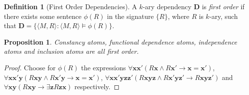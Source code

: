 \documentclass{article}
\newtheorem{Proposition}[Theorem]{Proposition}
\theoremstyle{definition}
\newtheorem{Definition}[Theorem]{Definition}
\newcommand{\tuple}{\mathbf}
\newcommand{\M}{\mathfrak M}
\newcommand{\D}{\mathbf D}
\begin{document}
\begin{Definition}[First Order Dependencies]
A $k$-ary dependency $\D$ is \emph{first order} if there exists some sentence $\phi(R)$ in the signature $\{R\}$, where $R$ is $k$-ary, such that $\D = \{\langle M, R\rangle : \langle M, R\rangle \models \phi(R)\}$.%
\label{def:fodep}
\end{Definition}
\begin{Proposition}
Constancy atoms, functional dependence atoms, independence atoms and inclusion atoms are all first order. 
\end{Proposition}
\begin{proof}
Choose for $\phi(R)$ the expressions $\forall \tuple x \tuple x' (R \tuple x \wedge R \tuple x' \rightarrow \tuple x = \tuple x')$, \\$\forall \tuple x \tuple x' \tuple y (R \tuple x \tuple y \wedge R \tuple x' \tuple y \rightarrow \tuple x = \tuple x')$, $\forall \tuple x \tuple x' \tuple y \tuple z \tuple z' (R \tuple x \tuple y \tuple z \wedge R \tuple x' \tuple y \tuple z' \rightarrow R \tuple x \tuple y \tuple z')$ and \\$\forall \tuple x \tuple y (R \tuple x \tuple y \rightarrow \exists \tuple z R \tuple z \tuple x)$ respectively.
\end{proof}
\end{document}
